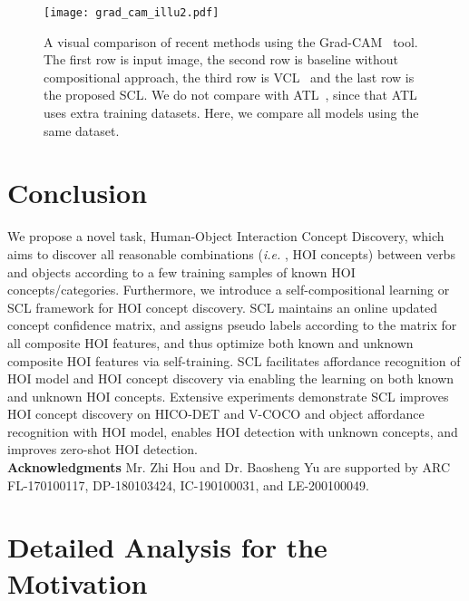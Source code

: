 \documentclass[runningheads]{llncs}
\newcommand{\ie}{\textit{i.e. }}
\begin{document}
\begin{figure}[!ht]
\centering
    \texttt{[image: grad\_cam\_illu2.pdf]}
    \caption{A visual comparison of recent methods using the Grad-CAM~\cite{selvaraju2017gradcam} tool. The first row is input image, the second row is baseline without compositional approach, the third row is VCL~\cite{hou2020visual} and the last row is the proposed SCL. We do not compare with ATL~\cite{hou2021atl}, since that ATL uses extra training datasets. Here, we compare all models using the same dataset. }
    \label{fig:vis_grad_cam}
    \vspace{-8mm}
\end{figure}






\section{Conclusion}
\label{sec:con}

We propose a novel task, Human-Object Interaction Concept Discovery, which aims to discover all reasonable combinations (\ie, HOI concepts) between verbs and objects according to a few training samples  of known HOI concepts/categories. Furthermore, we introduce a self-compositional learning or SCL framework for HOI concept discovery. SCL maintains an online updated concept confidence matrix, and assigns pseudo labels according to the matrix for all composite HOI features, and thus optimize both known and unknown composite HOI features via self-training. SCL facilitates affordance recognition of HOI model and HOI concept discovery via enabling the learning on both known and unknown HOI concepts. Extensive experiments demonstrate SCL improves HOI concept discovery on HICO-DET and V-COCO and object affordance recognition with HOI model, enables HOI detection with unknown concepts, and improves zero-shot HOI detection. \\
{\bf Acknowledgments} Mr. Zhi Hou and Dr. Baosheng Yu are supported by ARC FL-170100117, DP-180103424, IC-190100031, and LE-200100049.

\clearpage



\appendix

\section{Detailed Analysis for the Motivation}
\label{sec:detailed}
\end{document}
